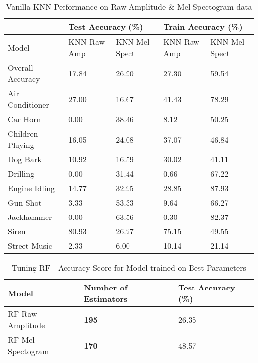 \documentclass[11pt]{article}
\begin{document}
\begin{table}[h!]
\centering
\begin{tabular}{lllll}
                 & \multicolumn{2}{l}{Test Accuracy (\%)} & \multicolumn{2}{l}{Train Accuracy (\%)} \\ \toprule
Model            & KNN Raw Amp       & KNN Mel Spect      & KNN Raw Amp       & KNN Mel Spect       \\ \toprule
Overall Accuracy & 17.84             & 26.90              & 27.30             & 59.54               \\ \midrule
Air Conditioner  & 27.00             & 16.67              & 41.43             & 78.29               \\
Car Horn         & 0.00              & 38.46              & 8.12              & 50.25               \\
Children Playing & 16.05             & 24.08              & 37.07             & 46.84               \\
Dog Bark         & 10.92             & 16.59              & 30.02             & 41.11               \\
Drilling         & 0.00              & 31.44              & 0.66              & 67.22               \\
Engine Idling    & 14.77             & 32.95              & 28.85             & 87.93               \\
Gun Shot         & 3.33              & 53.33              & 9.64              & 66.27               \\
Jackhammer       & 0.00              & 63.56              & 0.30              & 82.37               \\
Siren            & 80.93             & 26.27              & 75.15             & 49.55               \\
Street Music     & 2.33              & 6.00               & 10.14             & 21.14               \\ \bottomrule
\end{tabular}

\caption{\label{tab:4} Vanilla KNN Performance on Raw Amplitude \& Mel Spectogram data}
\end{table}


\begin{table}[h!]
\centering
\begin{tabular}{lll}
\toprule
Model             & Number of Estimators & Test Accuracy (\%) \\ \hline
RF Raw Amplitude  & \textbf{195}         & 26.35              \\
RF Mel Spectogram & \textbf{170}         & 48.57              \\ 
\bottomrule
\end{tabular}
\caption{\label{tab:5} Tuning RF - Accuracy Score for Model trained on Best Parameters}
\end{table}
\end{document}
